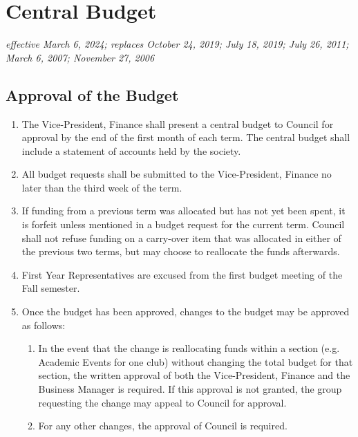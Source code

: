 \section{Central Budget}
\emph{effective March 6, 2024; replaces October 24, 2019; July 18, 2019; July 26, 2011; March 6, 2007; November 27, 2006}\\

\subsection{Approval of the Budget}
\begin{enumerate}
\item The Vice-President, Finance shall present a central budget to Council for approval by the end of the first month of each term. The central budget shall include a statement of accounts held by the society.
\item All budget requests shall be submitted to the Vice-President, Finance no later than the third week of the term.
\item If funding from a previous term was allocated but has not yet been spent, it is forfeit unless mentioned in a budget request for the current term. Council shall not refuse funding on a carry-over item that was allocated in either of the previous two terms, but may choose to reallocate the funds afterwards.
\item First Year Representatives are excused from the first budget meeting of the Fall semester.
\item Once the budget has been approved, changes to the budget may be approved as follows:
\begin{enumerate}
\item In the event that the change is reallocating funds within a section (e.g. Academic Events for one club) without changing the total budget for that section, the written approval of both the Vice-President, Finance and the Business Manager is required. If this approval is not granted, the group requesting the change may appeal to Council for approval.
\item For any other changes, the approval of Council is required.
\end{enumerate}
\end{enumerate}


